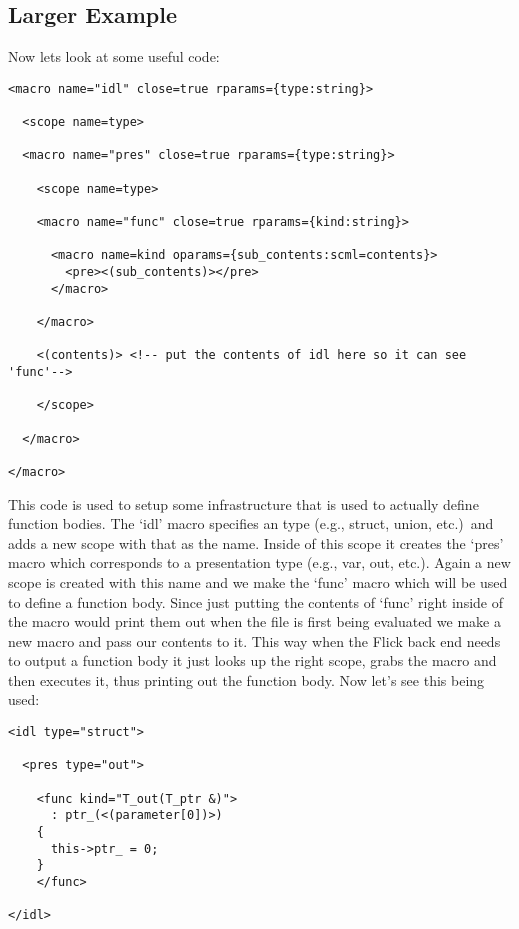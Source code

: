 \subsection{Larger Example}

Now lets look at some useful code:

\begin{verbatim}
<macro name="idl" close=true rparams={type:string}>

  <scope name=type>
  
  <macro name="pres" close=true rparams={type:string}>
  
    <scope name=type>
    
    <macro name="func" close=true rparams={kind:string}>
    
      <macro name=kind oparams={sub_contents:scml=contents}>
        <pre><(sub_contents)></pre>
      </macro>
      
    </macro>
    
    <(contents)> <!-- put the contents of idl here so it can see 'func'-->
    
    </scope>
    
  </macro>

</macro>
\end{verbatim}

This code is used to setup some infrastructure that is used to actually
define function bodies.  The `idl' macro specifies an \IDL{} type (e.g.,
struct, union, etc.)\ and adds a new scope with that as the name.  Inside
of this scope it creates the `pres' macro which corresponds to a
presentation type (e.g., var, out, etc.).  Again a new scope is created
with this name and we make the `func' macro which will be used to define a
function body.  Since just putting the contents of `func' right inside of
the macro would print them out when the file is first being evaluated we
make a new macro and pass our contents to it.  This way when the Flick
back end needs to output a function body it just looks up the right scope,
grabs the macro and then executes it, thus printing out the function body.
Now let's see this being used:

\begin{verbatim}
<idl type="struct">

  <pres type="out">

    <func kind="T_out(T_ptr &)">
      : ptr_(<(parameter[0])>)
    {
      this->ptr_ = 0;
    }
    </func>

</idl>
\end{verbatim}

